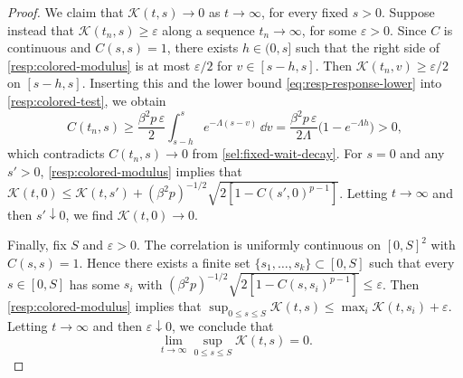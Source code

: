 \begin{proof}
We claim that $\mathcal K(t,s)\to0$ as $t\to\infty$, for every fixed $s>0$. Suppose instead that $\mathcal K(t_n,s)\ge\varepsilon$ along a sequence $t_n\to\infty$, for some $\varepsilon>0$. Since $C$ is continuous and $C(s,s)=1$, there exists $h\in(0,s]$ such that the right side of \eqref{resp:colored-modulus} is at most $\varepsilon/2$ for $v\in[s-h,s]$. Then $\mathcal K(t_n,v)\ge\varepsilon/2$ on $[s-h,s]$. Inserting this and the lower bound \eqref{eq:resp-response-lower} into \eqref{resp:colored-test}, we obtain
\[
 C(t_n,s)\ge\frac{\beta^2p\,\varepsilon}2\int_{s-h}^se^{-\Lambda(s-v)}\,\dd v
 =\frac{\beta^2p\,\varepsilon}{2\Lambda}\bigl(1-e^{-\Lambda h}\bigr)>0,
\]
which contradicts $C(t_n,s)\to0$ from \eqref{sel:fixed-wait-decay}. For $s=0$ and any $s'>0$, \eqref{resp:colored-modulus} implies that $\mathcal K(t,0)\le\mathcal K(t,s')+(\beta^2p)^{-1/2}\sqrt{2[1-C(s',0)^{p-1}]}$. Letting $t\to\infty$ and then $s'\downarrow0$, we find $\mathcal K(t,0)\to0$.

Finally, fix $S$ and $\varepsilon>0$. The correlation is uniformly continuous on $[0,S]^2$ with $C(s,s)=1$. Hence there exists a finite set $\{s_1,\dots,s_k\}\subset[0,S]$ such that every $s\in[0,S]$ has some $s_i$ with $(\beta^2p)^{-1/2}\sqrt{2[1-C(s,s_i)^{p-1}]}\le\varepsilon$. Then \eqref{resp:colored-modulus} implies that $\sup_{0\le s\le S}\mathcal K(t,s)\le\max_i\mathcal K(t,s_i)+\varepsilon$. Letting $t\to\infty$ and then $\varepsilon\downarrow0$, we conclude that
\begin{equation}\label{eq:resp-colored-forgetting}
 \lim_{t\to\infty}\sup_{0\le s\le S}\mathcal K(t,s)=0.
\end{equation}


\end{proof}

